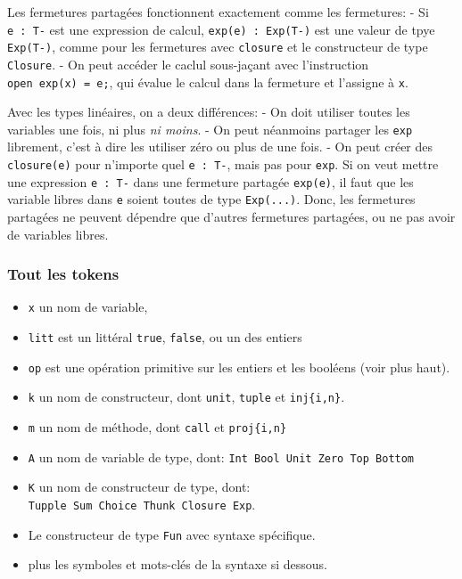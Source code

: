 \documentclass[12pt]{article}
\begin{document}
Les fermetures partagées fonctionnent exactement comme les fermetures: -
Si \texttt{e\ :\ T-} est une expression de calcul,
\texttt{exp(e)\ :\ Exp(T-)} est une valeur de tpye \texttt{Exp(T-)},
comme pour les fermetures avec \texttt{closure} et le constructeur de
type \texttt{Closure}. - On peut accéder le caclul sous-jaçant avec
l'instruction \texttt{open\ exp(x)\ =\ e;}, qui évalue le calcul dans la
fermeture et l'assigne à \texttt{x}.

Avec les types linéaires, on a deux différences: - On doit utiliser
toutes les variables une fois, ni plus \emph{ni moins}. - On peut
néanmoins partager les \texttt{exp} librement, c'est à dire les utiliser
zéro ou plus de une fois. - On peut créer des \texttt{closure(e)} pour
n'importe quel \texttt{e\ :\ T-}, mais pas pour \texttt{exp}. Si on veut
mettre une expression \texttt{e\ :\ T-} dans une fermeture partagée
\texttt{exp(e)}, il faut que les variable libres dans \texttt{e} soient
toutes de type \texttt{Exp(...)}. Donc, les fermetures partagées ne
peuvent dépendre que d'autres fermetures partagées, ou ne pas avoir de
variables libres.

\pagebreak

\hypertarget{tout-les-tokens}{%
      \subsubsection*{Tout les tokens}\label{tout-les-tokens}}

\begin{itemize}
      \tightlist
      \item
            \texttt{x} un nom de variable,
      \item
            \texttt{litt} est un littéral \texttt{true}, \texttt{false}, ou un des
            entiers
      \item
            \texttt{op} est une opération primitive sur les entiers et les
            booléens (voir plus haut).
      \item
            \texttt{k} un nom de constructeur, dont \texttt{unit}, \texttt{tuple}
            et \texttt{inj\{i,n\}}.
      \item
            \texttt{m} un nom de méthode, dont \texttt{call} et
            \texttt{proj\{i,n\}}
      \item
            \texttt{A} un nom de variable de type, dont:
            \texttt{Int\ Bool\ Unit\ Zero\ Top\ Bottom}
      \item
            \texttt{K} un nom de constructeur de type, dont:
            \texttt{Tupple\ Sum\ Choice\ Thunk\ Closure\ Exp}.
      \item
            Le constructeur de type \texttt{Fun} avec syntaxe spécifique.
      \item
            plus les symboles et mots-clés de la syntaxe si dessous.
\end{itemize}
\end{document}
